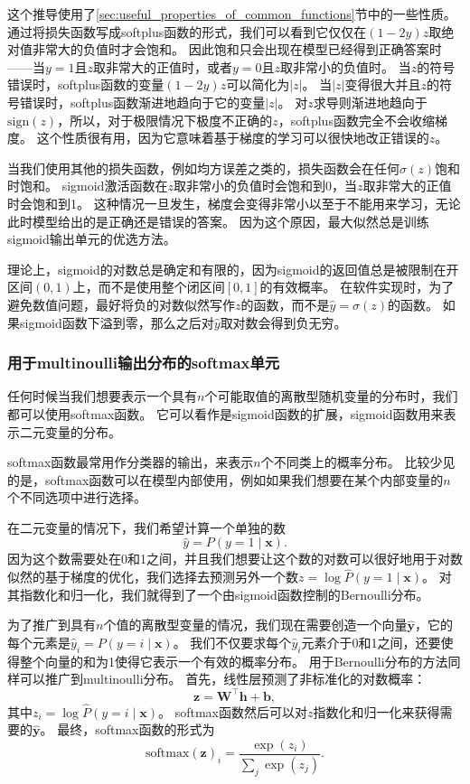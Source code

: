 这个推导使用了\ref{sec:useful_properties_of_common_functions}节中的一些性质。
通过将损失函数写成softplus函数的形式，我们可以看到它仅仅在$(1-2y)z$取绝对值非常大的负值时才会饱和。
因此饱和只会出现在模型已经得到正确答案时——当$y=1$且$z$取非常大的正值时，或者$y=0$且$z$取非常小的负值时。
当$z$的符号错误时，softplus函数的变量$(1-2y)z$可以简化为$|z|$。
当$|z|$变得很大并且$z$的符号错误时，softplus函数渐进地趋向于它的变量$|z|$。
对$z$求导则渐进地趋向于$\text{sign}(z)$，所以，对于极限情况下极度不正确的$z$，softplus函数完全不会收缩梯度。
这个性质很有用，因为它意味着基于梯度的学习可以很快地改正错误的$z$。

当我们使用其他的损失函数，例如均方误差之类的，损失函数会在任何$\sigma(z)$饱和时饱和。
sigmoid激活函数在$z$取非常小的负值时会饱和到0，当$z$取非常大的正值时会饱和到1。
这种情况一旦发生，梯度会变得非常小以至于不能用来学习，无论此时模型给出的是正确还是错误的答案。
因为这个原因，最大似然总是训练sigmoid输出单元的优选方法。

理论上，sigmoid的对数总是确定和有限的，因为sigmoid的返回值总是被限制在开区间$(0, 1)$上，而不是使用整个闭区间$[0, 1]$的有效概率。
在软件实现时，为了避免数值问题，最好将负的对数似然写作$z$的函数，而不是$\hat{y}=\sigma(z)$的函数。
如果sigmoid函数下溢到零，那么之后对$\hat{y}$取对数会得到负无穷。

\subsubsection{用于multinoulli输出分布的softmax单元}
\label{sec:softmax_units_for_multinoulli_output_distributions}

任何时候当我们想要表示一个具有$n$个可能取值的离散型随机变量的分布时，我们都可以使用softmax函数。
它可以看作是sigmoid函数的扩展，sigmoid函数用来表示二元变量的分布。


softmax函数最常用作分类器的输出，来表示$n$个不同类上的概率分布。
比较少见的是，softmax函数可以在模型内部使用，例如如果我们想要在某个内部变量的$n$个不同选项中进行选择。

在二元变量的情况下，我们希望计算一个单独的数
\begin{equation}
\hat{y} = P(y=1\mid\bm{x}).
\end{equation}
因为这个数需要处在0和1之间，并且我们想要让这个数的对数可以很好地用于对数似然的基于梯度的优化，我们选择去预测另外一个数$z=\log \hat{P}(y=1\mid\bm{x})$。
对其指数化和归一化，我们就得到了一个由sigmoid函数控制的Bernoulli分布。

为了推广到具有$n$个值的离散型变量的情况，我们现在需要创造一个向量$\hat{\bm{y}}$，它的每个元素是$\hat{y}_i = P(y=i\mid\bm{x})$。
我们不仅要求每个$\hat{y}_i$元素介于0和1之间，还要使得整个向量的和为1使得它表示一个有效的概率分布。
用于Bernoulli分布的方法同样可以推广到multinoulli分布。
首先，线性层预测了非标准化的对数概率：
\begin{equation}
\bm{z} = \bm{W}^\top \bm{h}+\bm{b},
\end{equation}
其中$z_i=\log \hat{P}(y=i\mid\bm{x})$。
softmax函数然后可以对$z$指数化和归一化来获得需要的$\hat{\bm{y}}$。
最终，softmax函数的形式为
\begin{equation}
\text{softmax}(\bm{z})_i = \frac{\exp(z_i)}{\sum_j \exp(z_j)}.
\end{equation}

